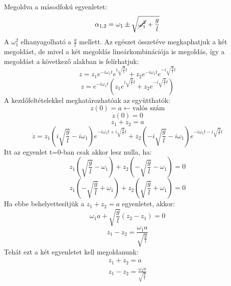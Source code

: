 \documentclass[../main.tex]{subfiles}
\begin{document}
Megoldva a másodfokú egyenletet:
 \begin{equation}
    \alpha_{1,2} = \omega_1 \pm \sqrt{\cancel{\omega_1^2} + \frac{g}{l}}
 \end{equation}
A $\omega_1^2$ elhanyagolható a $\frac{g}{l}$ mellett. Az egészet összetéve megkaphatjuk a két megoldást, de mivel a két megoldás lineárkombinációja is megoldás, így a megoldást a következő alakban is felírhatjuk:
\begin{equation}
    z = z_1 e^{-i\omega_1 t} e^{i\sqrt{\frac{g}{l}}t} + z_2 e^{-i\omega_1 t} e^{-i\sqrt{\frac{g}{l}}t} 
\end{equation}
\begin{equation}
    z = e^{-i\omega_1 t} \left(z_1 e^{i\sqrt{\frac{g}{l}}t} + z_2 e^{-i\sqrt{\frac{g}{l}}t}\right)
\end{equation}
A kezdőfeltételekkel meghatározhatóak az együtthatók:
\begin{equation}
    z(0) = a \leftarrow \text{valós szám}
\end{equation}
\begin{equation}
    \dot{z}(0) = 0
\end{equation}
\begin{equation}
    z_1 + z_2 = a
\end{equation}
\begin{equation}
    \dot{z} = z_1 \left(i\sqrt{\frac{g}{l}} - i\omega_1\right) e^{-i\omega_1t + i\sqrt{\frac{g}{l}}t} + z_2 \left(-i\sqrt{\frac{g}{l}} - i\omega_1\right) e^{-i\omega_1t - i\sqrt{\frac{g}{l}}t}
\end{equation}
Itt az egyenlet t=0-ban csak akkor lesz nulla, ha:
\begin{equation}
    z_1 \left(\sqrt{\frac{g}{l}} - \omega_1\right) + z_2 \left(-\sqrt{\frac{g}{l}} - \omega_1\right) = 0
\end{equation}
\begin{equation}
    z_1 \left(-\sqrt{\frac{g}{l}} + \omega_1\right) + z_2 \left(\sqrt{\frac{g}{l}} + \omega_1\right) = 0
\end{equation}
Ha ebbe behelyettesítjük a $z_1 + z_2 = a$ egyenletet, akkor:
\begin{equation}
    \omega_1 a + \sqrt{\frac{g}{l}}(z_2 - z_1) = 0
\end{equation}
\begin{equation}
    z_1 - z_2 = \frac{\omega_1 a}{\sqrt{\frac{g}{l}}}
\end{equation}
Tehát ezt a két egyenletet kell megoldanunk:
\begin{gather}
    z_1 + z_2 = a \\
    z_1 - z_2 = \frac{\omega_1 a}{\sqrt{\frac{g}{l}}}
\end{gather}
\end{document}
